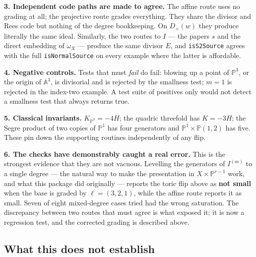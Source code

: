 \documentclass[11pt,reqno]{amsart}
\newcommand{\PP}{\ensuremath{\mathbb{P}}}
\newcommand{\bbA}{\ensuremath{\mathbb{A}}}
\theoremstyle{plain}
\theoremstyle{definition}
\begin{document}
\textbf{3. Independent code paths are made to agree.} The affine route
uses no grading at all; the projective route grades everything. They
share the divisor and Rees code but nothing of the degree bookkeeping.
On \(D_+(w)\) they produce literally the same ideal. Similarly, the two
routes to \(I\) --- the paper\textquotesingle s \(s\) and the direct
embedding of \(\omega_X\) --- produce the same divisor \(E\), and
\texttt{isS2Source} agrees with the full \texttt{isNormalSource} on
every example where the latter is affordable.

\textbf{4. Negative controls.} Tests that must \emph{fail} do fail:
blowing up a point of \(\PP^3\), or the origin of \(\bbA^3\), is divisorial
and is rejected by the smallness test; \(m = 1\) is rejected in the
index-two example. A test suite of positives only would not detect a
smallness test that always returns true.

\textbf{5. Classical invariants.} \(K_{\PP^3} = -4H\); the quadric
threefold has \(K = -3H\); the Segre product of two copies of \(\PP^1\)
has four generators and \(\PP^1 \times \PP{}(1,2)\) has five. These pin down
the supporting routines independently of any flip.

\textbf{6. The checks have demonstrably caught a real error.} This is
the strongest evidence that they are not vacuous. Levelling the
generators of \(I^{(m)}\) to a single degree --- the natural way to make
the presentation in \(X \times \PP^{r-1}\) work, and what this package did
originally --- reports the toric flip above as \textbf{not small} when
the base is graded by \(\ell = (3,2,1)\), while the affine route reports
it as small. Seven of eight mixed-degree cases tried had the wrong
saturation. The discrepancy between two routes that must agree is what
exposed it; it is now a regression test, and the corrected grading is
described above.

\subsection{What this does not
establish}\label{what-this-does-not-establish}
\end{document}
